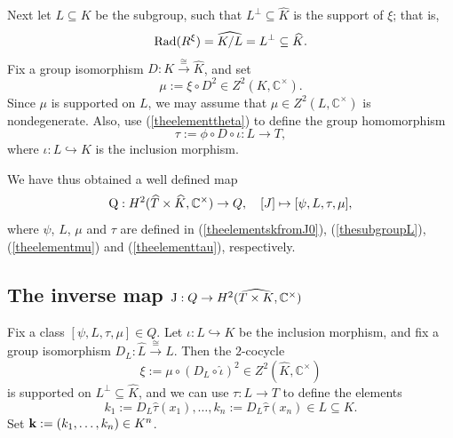 \documentclass{amsart}
\theoremstyle{definition}
\numberwithin{equation}{section}
\begin{document}
Next let $L\subseteq K$ be the subgroup, such that $L^{\perp}\subseteq \widehat{K}$ is the support of $\xi$; that is,
\begin{equation}\label{thesubgroupL}
{\rm Rad}(R^{\xi})=\widehat{K/L}=L^{\perp}\subseteq \widehat{K}.
\end{equation}
Fix a group isomorphism $D:K\xrightarrow{\cong}\widehat{K}$, and set 
\begin{equation}\label{theelementmu}
\mu:=\xi\circ D^2\in Z^2(K,\mathbb{C}^{\times}). 
\end{equation}
Since $\mu$ is supported on $L$, we may assume that $\mu\in Z^2(L,\mathbb{C}^{\times})$ is nondegenerate. 
Also, use (\ref{theelementtheta}) to define the group homomorphism 
\begin{equation}\label{theelementtau}
\tau:=\phi\circ D\circ \iota:L\to T,
\end{equation}
where $\iota:L\hookrightarrow K$ is the inclusion morphism. 

We have thus obtained a well defined map
\begin{equation}\label{themapQ}
{\rm Q}:H^2(\widehat{T}\times \widehat{K},\mathbb{C}^{\times})\to Q,\quad [J]\mapsto [\psi,L,\tau,\mu],
\end{equation}
where $\psi$, $L$, $\mu$ and $\tau$ are defined in (\ref{theelementskfromJ0}), (\ref{thesubgroupL}), (\ref{theelementmu}) and (\ref{theelementtau}), respectively. 

\subsection{The inverse map ${\rm J}:Q\to H^2(\widehat{T\times K},\mathbb{C}^{\times})$}
Fix a class $[\psi,L,\tau,\mu]\in Q$. Let $\iota:L\hookrightarrow K$ be the inclusion morphism, and fix a group isomorphism $D_L:\widehat{L}\xrightarrow{\cong}L$. Then the $2$-cocycle
\begin{equation}\label{theelementxi}
\xi:=\mu\circ (D_L\circ\widehat{\iota})^2\in Z^2(\widehat{K},\mathbb{C}^{\times})
\end{equation} 
is supported on $L^{\perp}\subseteq \widehat{K}$, and we can use $\tau: L\to T$ to define the elements 
\begin{equation}\label{theelementsk}
k_1:=D_L\widehat{\tau}(x_1),\dots,k_n:=D_L\widehat{\tau}(x_n)\in L\subseteq K.
\end{equation}
Set ${\bf k}:=(k_1,\dots,k_n)\in K^n$.
\end{document}
